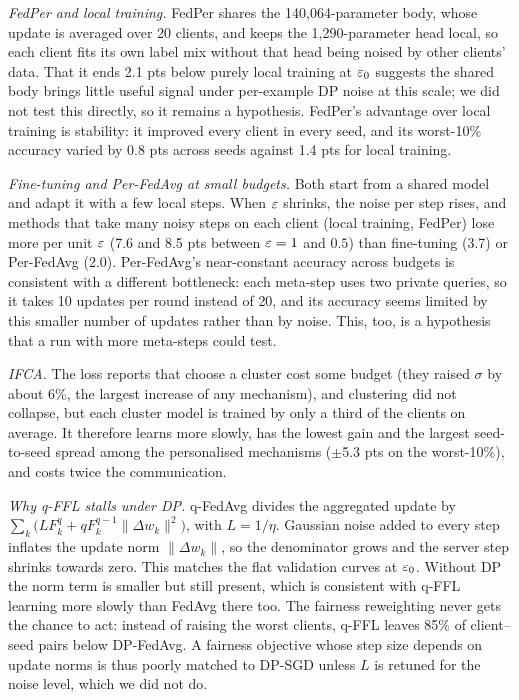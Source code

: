 \emph{FedPer and local training.} FedPer shares the 140{,}064-parameter body, whose update is averaged over 20 clients,
and keeps the 1{,}290-parameter head local, so each client fits its own label mix without that head being noised by
other clients' data. That it ends 2.1 pts below purely local training at $\varepsilon_0$ suggests the shared body brings
little useful signal under per-example DP noise at this scale; we did not test this directly, so it remains a
hypothesis. FedPer's advantage over local training is stability: it improved every client in every seed, and its
worst-10\% accuracy varied by 0.8 pts across seeds against 1.4 pts for local training.

\emph{Fine-tuning and Per-FedAvg at small budgets.} Both start from a shared model and adapt it with a few local steps.
When $\varepsilon$ shrinks, the noise per step rises, and methods that take many noisy steps on each client (local
training, FedPer) lose more per unit $\varepsilon$ (7.6 and 8.5 pts between $\varepsilon=1$ and $0.5$) than fine-tuning (3.7) or
Per-FedAvg (2.0). Per-FedAvg's near-constant accuracy across budgets is consistent with a different bottleneck: each
meta-step uses two private queries, so it takes 10 updates per round instead of 20, and its accuracy seems limited by
this smaller number of updates rather than by noise. This, too, is a hypothesis that a run with more meta-steps could
test.

\emph{IFCA.} The loss reports that choose a cluster cost some budget (they raised $\sigma$ by about 6\%, the largest
increase of any mechanism), and clustering did not collapse, but each cluster model is trained by only a third of the clients on average. It therefore
learns more slowly, has the lowest gain and the largest seed-to-seed spread among the personalised mechanisms
($\pm$5.3 pts on the worst-10\%), and costs twice the communication.

\emph{Why q-FFL stalls under DP.} q-FedAvg divides the aggregated update by
$\sum_k\big(LF_k^{q}+qF_k^{q-1}\lVert\Delta w_k\rVert^2\big)$, with $L=1/\eta$. Gaussian noise added to every step
inflates the update norm $\lVert\Delta w_k\rVert$, so the denominator grows and the server step shrinks towards zero.
This matches the flat validation curves at $\varepsilon_0$. Without DP the norm term is smaller but still present, which is
consistent with q-FFL learning more slowly than FedAvg there too. The fairness reweighting never gets the chance to act: instead of raising the
worst clients, q-FFL leaves 85\% of client--seed pairs below DP-FedAvg. A fairness objective whose step size depends
on update norms is thus poorly matched to DP-SGD unless $L$ is retuned for the noise level, which we did not do.

